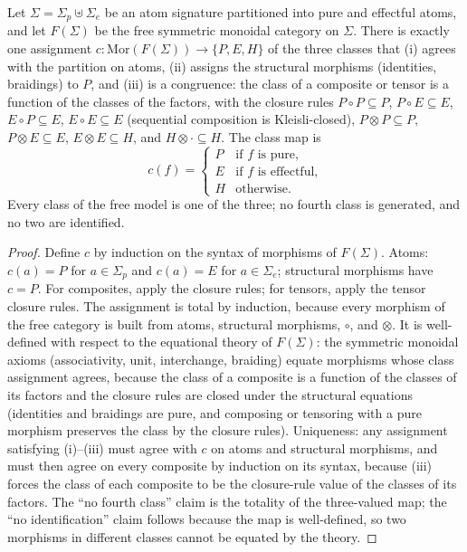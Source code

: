 \begin{theorem}\label{thm:classification}
Let $\Sigma = \Sigma_p \uplus \Sigma_e$ be an atom signature partitioned
into pure and effectful atoms, and let $F(\Sigma)$ be the free
symmetric monoidal category on $\Sigma$. There is exactly one
assignment $c : \mathrm{Mor}(F(\Sigma)) \to \{P, E, H\}$ of the three
classes that (i) agrees with the partition on atoms, (ii) assigns the
structural morphisms (identities, braidings) to $P$, and (iii) is a
congruence: the class of a composite or tensor is a function of the
classes of the factors, with the closure rules
$P \circ P \subseteq P$, $P \circ E \subseteq E$,
$E \circ P \subseteq E$, $E \circ E \subseteq E$ (sequential
composition is Kleisli-closed), $P \otimes P \subseteq P$,
$P \otimes E \subseteq E$, $E \otimes E \subseteq H$, and
$H \otimes \cdot \subseteq H$. The class map is
\[
c(f) = \begin{cases}
P & \text{if } f \text{ is pure,}\\
E & \text{if } f \text{ is effectful,}\\
H & \text{otherwise.}
\end{cases}
\]
Every class of the free model is one of the three; no fourth class is
generated, and no two are identified.
\end{theorem}

\begin{proof}
Define $c$ by induction on the syntax of morphisms of $F(\Sigma)$.
Atoms: $c(a) = P$ for $a \in \Sigma_p$ and $c(a) = E$ for
$a \in \Sigma_e$; structural morphisms have $c = P$. For composites,
apply the closure rules; for tensors, apply the tensor closure rules.
The assignment is total by induction, because every morphism of the
free category is built from atoms, structural morphisms, $\circ$, and
$\otimes$. It is well-defined with respect to the equational theory of
$F(\Sigma)$: the symmetric monoidal axioms (associativity, unit,
interchange, braiding) equate morphisms whose class assignment agrees,
because the class of a composite is a function of the classes of its
factors and the closure rules are closed under the structural
equations (identities and braidings are pure, and composing or
tensoring with a pure morphism preserves the class by the closure
rules). Uniqueness: any assignment satisfying (i)--(iii) must agree
with $c$ on atoms and structural morphisms, and must then agree on
every composite by induction on its syntax, because (iii) forces the
class of each composite to be the closure-rule value of the classes of
its factors. The ``no fourth class'' claim is the totality of the
three-valued map; the ``no identification'' claim follows because the
map is well-defined, so two morphisms in different classes cannot be
equated by the theory.
\end{proof}

